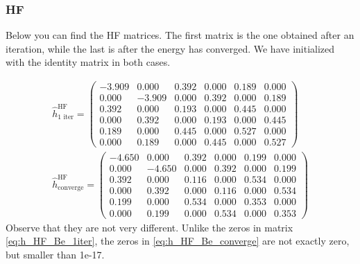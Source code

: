 \subsubsection{HF}
Below you can find the HF matrices. The first matrix is the one obtained after an iteration, while the last is after the energy has converged. We have initialized with the identity matrix in both cases. 

\begin{align}
\hat{h}_{\text{1 iter}}^{\text{HF}}=
\begin{pmatrix}
-3.909 & 0.000 & 0.392 & 0.000 & 0.189 & 0.000\\
0.000 & -3.909 & 0.000 & 0.392 & 0.000 & 0.189\\
0.392 & 0.000 & 0.193 & 0.000 & 0.445 & 0.000\\
0.000 & 0.392 & 0.000 & 0.193 & 0.000 & 0.445\\
0.189 & 0.000 & 0.445 & 0.000 & 0.527 & 0.000\\
0.000 & 0.189 & 0.000 & 0.445 & 0.000 & 0.527
\end{pmatrix}\label{eq:h_HF_Be_1iter}\\
\hat{h}_{\text{converge}}^{\text{HF}}=
\begin{pmatrix}
-4.650 & 0.000 & 0.392 & 0.000 & 0.199 & 0.000\\
0.000 & -4.650 & 0.000 & 0.392 & 0.000 & 0.199\\
0.392 & 0.000 & 0.116 & 0.000 & 0.534 & 0.000\\
0.000 & 0.392 & 0.000 & 0.116 & 0.000 & 0.534\\
0.199 & 0.000 & 0.534 & 0.000 & 0.353 & 0.000\\
0.000 & 0.199 & 0.000 & 0.534 & 0.000 & 0.353
\end{pmatrix}
\label{eq:h_HF_Be_converge}
\end{align}
Observe that they are not very different. Unlike the zeros in matrix \eqref{eq:h_HF_Be_1iter}, the zeros in \eqref{eq:h_HF_Be_converge} are not exactly zero, but smaller than 1e-17. 


